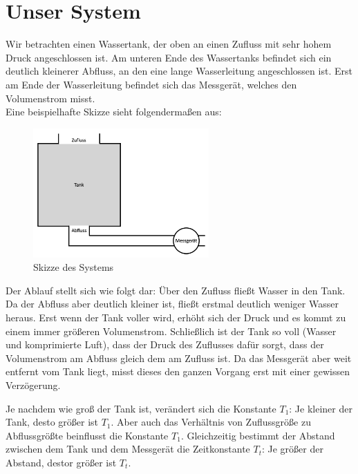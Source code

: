 \section{Unser System}
Wir betrachten einen Wassertank, der oben an einen Zufluss mit sehr hohem Druck angeschlossen ist. Am unteren Ende des Wassertanks befindet sich ein deutlich kleinerer Abfluss, an den eine lange Wasserleitung angeschlossen ist. Erst am Ende der Wasserleitung befindet sich das Messgerät, welches den Volumenstrom misst. \\
Eine beispielhafte Skizze sieht folgendermaßen aus:
\begin{figure}[H]
    \label{fig:tank}
    \centering
    \includegraphics[width=0.6\textwidth]{Bilder/Tank.png}
    \caption{Skizze des Systems}
 \end{figure}
Der Ablauf stellt sich wie folgt dar: Über den Zufluss fließt Wasser in den Tank. Da der Abfluss aber deutlich kleiner ist, fließt erstmal deutlich weniger Wasser heraus. Erst wenn der Tank voller wird, erhöht sich der Druck und es kommt zu einem immer größeren Volumenstrom. Schließlich ist der Tank so voll (Wasser und komprimierte Luft), dass der Druck des Zuflusses dafür sorgt, dass der Volumenstrom am Abfluss gleich dem am Zufluss ist. Da das Messgerät aber weit entfernt vom Tank liegt, misst dieses den ganzen Vorgang erst mit einer gewissen Verzögerung.

Je nachdem wie groß der Tank ist, verändert sich die Konstante $T_1$: Je kleiner der Tank, desto größer ist $T_1$. Aber auch das Verhältnis von Zuflussgröße zu Abflussgrößte beinflusst die Konstante $T_1$. Gleichzeitig bestimmt der Abstand zwischen dem Tank und dem Messgerät die Zeitkonstante $T_t$: Je größer der Abstand, destor größer ist $T_t$.

